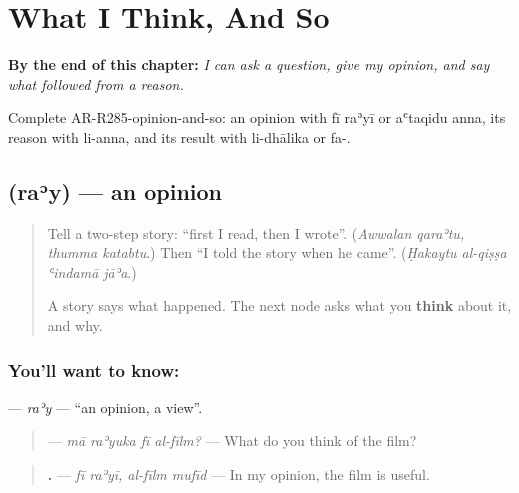 
\chapter{What I Think, And So}
\label{ch:ar-what-i-think-and-so}

\begin{chapteropening}
\textbf{By the end of this chapter:} \emph{I can ask a question, give my opinion, and say what followed from a reason.}

Complete AR-R285-opinion-and-so: an opinion with fī raʾyī or aʿtaqidu anna, its reason with li-anna, and its result with li-dhālika or fa-.
\end{chapteropening}

\section[\texorpdfstring{\ar{رأي} (raʾy)}{رأي (raʾy)}]{ (raʾy) — an opinion}

\label{lesson:AR-C285-ray}



\begin{quote}
Tell a two-step story: \textquotedblleft{}first I read, then I wrote\textquotedblright{}. (\emph{Awwalan qaraʾtu, thumma katabtu}.) Then \textquotedblleft{}I told the story when he came\textquotedblright{}. (\emph{Ḥakaytu al-qiṣṣa ʿindamā jāʾa}.)

A story says what happened. The next node asks what you \textbf{think} about it, and why.
\end{quote}

\subsection*{You'll want to know: }
\textbf{} — \emph{raʾy} — \textquotedblleft{}an opinion, a view\textquotedblright{}.

\begin{quote}
\textbf{   } — \emph{mā raʾyuka fī al-fīlm?} — What do you think of the film?
\end{quote}

\begin{quote}
\textbf{   .} — \emph{fī raʾyī, al-fīlm mufīd} — In my opinion, the film is useful.
\end{quote}

